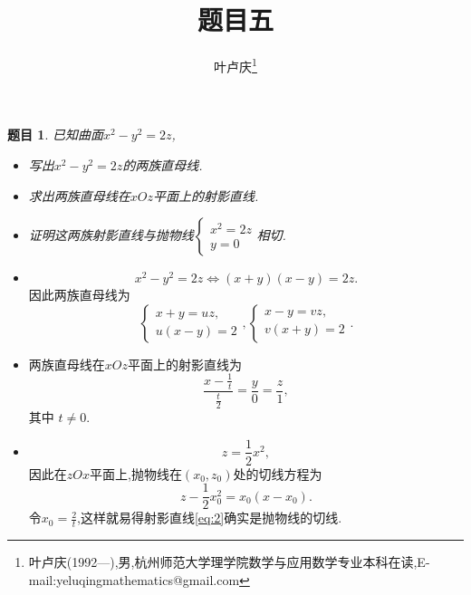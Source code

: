\documentclass[a4paper]{article}
\newtheorem*{exe}{题目}
\newenvironment{exercise}
{\bigskip\begin{mdframed}\begin{exe}}
    {\end{exe}\end{mdframed}\bigskip}
\begin{document}
\title{\huge{\bf{题目五}}} \author{\small{叶卢庆\footnote{叶卢庆(1992---),男,杭州师范大学理学院数学与应用数学专业本科在读,E-mail:yeluqingmathematics@gmail.com}}}
\maketitle
\begin{exercise}
已知曲面$x^2-y^2=2z$,
\begin{itemize}
\item 写出$x^2-y^2=2z$的两族直母线.
\item 求出两族直母线在$xOz$平面上的射影直线.
\item 证明这两族射影直线与抛物线$
  \begin{cases}
    x^2=2z\\
y=0
  \end{cases}
$相切.
\end{itemize}
\end{exercise}
\begin{itemize}
\item 
$$
x^2-y^2=2z\iff (x+y)(x-y)=2z.
$$
因此两族直母线为
$$
\begin{cases}
  x+y=uz,\\
u(x-y)=2
\end{cases},
\begin{cases}
  x-y=vz,\\
v(x+y)=2
\end{cases}.
$$
\item 两族直母线在$xOz$平面上的射影直线为
\begin{equation}\label{eq:2}
\frac{x-\frac{1}{t}}{\frac{t}{2}}=\frac{y}{0}=\frac{z}{1},
\end{equation}
其中 $t\neq 0$.
\item 
$$
z=\frac{1}{2}x^2,
$$
因此在$zOx$平面上,抛物线在$(x_0,z_0)$处的切线方程为
$$
z-\frac{1}{2}x_0^2=x_0(x-x_0).
$$
令$x_0=\frac{2}{t}$,这样就易得射影直线\eqref{eq:2}确实是抛物线的切线.
\end{itemize}
\end{document}
